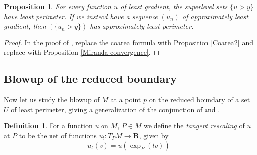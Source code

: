 \documentclass[reqno,10pt]{amsart}
\newcommand{\RR}{\mathbf{R}}
\newcommand{\dfn}[1]{\emph{#1}\index{#1}}
\newtheorem{proposition}[theorem]{Proposition}
\theoremstyle{definition}
\newtheorem{definition}[theorem]{Definition}
\numberwithin{equation}{section}
\begin{document}
\begin{proposition}\label{level sets are minimal}
For every function $u$ of least gradient, the superlevel sets $\{u > y\}$ have least perimeter.
If we instead have a sequence $(u_n)$ of approximately least gradient, then $(\{u_n > y\})$ has approximately least perimeter.
\end{proposition}
\begin{proof}
In the proof of \cite[Theorem 1]{BOMBIERI1969}, replace the coarea formula \cite[Theorem 1.6]{Miranda66} with Proposition \ref{Coarea2} and replace \cite[Teorema 3]{Miranda67} with Proposition \ref{Miranda convergence}.
\end{proof}


\subsection{Blowup of the reduced boundary}
Now let us study the blowup of $M$ at a point $p$ on the reduced boundary of a set $U$ of least perimeter, giving a generalization of the conjunction of \cite[Theorem 9.3]{Giusti77} and \cite[Theorem 6.2.2]{Simons68}.

\begin{definition}
For a function $u$ on $M$, $P \in M$ we define the \dfn{tangent rescaling} of $u$ at $P$ to be the net of functions $u_t: T_PM \to \RR$, given by
$$u_t(v) = u\left(\exp_P(tv)\right)$$
\end{definition}
\end{document}
